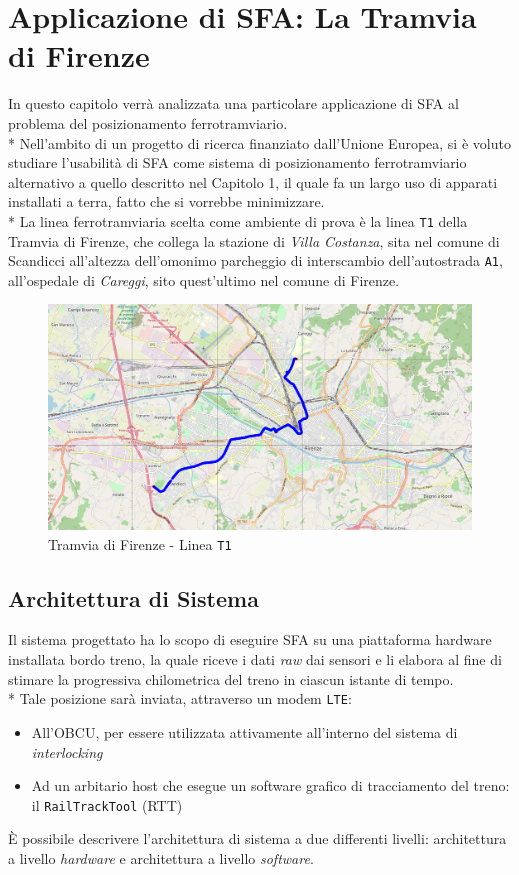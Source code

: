 \chapter{Applicazione di SFA: La Tramvia di Firenze}
In questo capitolo verr\`a analizzata una particolare applicazione di SFA al problema del posizionamento ferrotramviario.\\*
Nell'ambito di un progetto di ricerca finanziato dall'Unione Europea, si \`e voluto studiare l'usabilit\`a di SFA come sistema di posizionamento ferrotramviario alternativo a quello descritto nel Capitolo 1, il quale fa un largo uso di apparati installati a terra, fatto che si vorrebbe minimizzare.\\*
La linea ferrotramviaria scelta come ambiente di prova \`e la linea \texttt{T1} della Tramvia di Firenze, che collega la stazione di \emph{Villa Costanza}, sita nel comune di Scandicci all'altezza dell'omonimo parcheggio di interscambio dell'autostrada \texttt{A1}, all'ospedale di \emph{Careggi}, sito quest'ultimo nel comune di Firenze.
\begin{figure}[h]
	\centering
	\includegraphics[width=\linewidth]{img/t1}
	\caption{Tramvia di Firenze - Linea \texttt{T1}}
	\label{fig:t1}
\end{figure}
\section{Architettura di Sistema}
Il sistema progettato ha lo scopo di eseguire SFA su una piattaforma hardware installata bordo treno, la quale riceve i dati \emph{raw} dai sensori e li elabora al fine di stimare la progressiva chilometrica del treno in ciascun istante di tempo.\\*
Tale posizione sar\`a inviata, attraverso un modem \texttt{LTE}:
\begin{itemize}
	\item All'OBCU, per essere utilizzata attivamente all'interno del sistema di \emph{interlocking}
	\item Ad un arbitario host che esegue un software grafico di tracciamento del treno: il \texttt{RailTrackTool} (RTT)
\end{itemize}
\`E possibile descrivere l'architettura di sistema a due differenti livelli: architettura a livello \emph{hardware} e architettura a livello \emph{software}.
